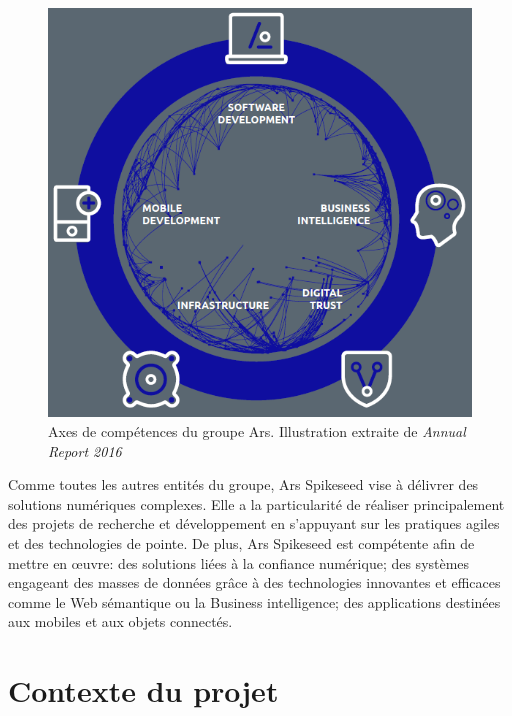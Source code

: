 \documentclass{tnreport}
\begin{document}
\begin{figure}[h]
	\centering
	\includegraphics[scale=0.7]{figures/arhs-core-services}
	\caption{Axes de compétences du groupe Ar{\texteta}s. Illustration extraite de \textit{Annual Report 2016}~\cite{annual-report}}
	\label{fig:arhs-core-services}
\end{figure}

Comme toutes les autres entités du groupe, Ar{\texteta}s Spikeseed vise à délivrer des solutions numériques complexes. Elle a la particularité de réaliser principalement des projets de recherche et développement en s'appuyant sur les pratiques agiles et des technologies de pointe. 
De plus, Ar{\texteta}s Spikeseed est compétente afin de mettre en œuvre: 
des solutions liées à la confiance numérique; 
des systèmes engageant des masses de données grâce à des technologies innovantes et efficaces comme le Web sémantique ou la Business intelligence; 
des applications destinées aux mobiles et aux objets connectés.

\section{Contexte du projet}
\end{document}
